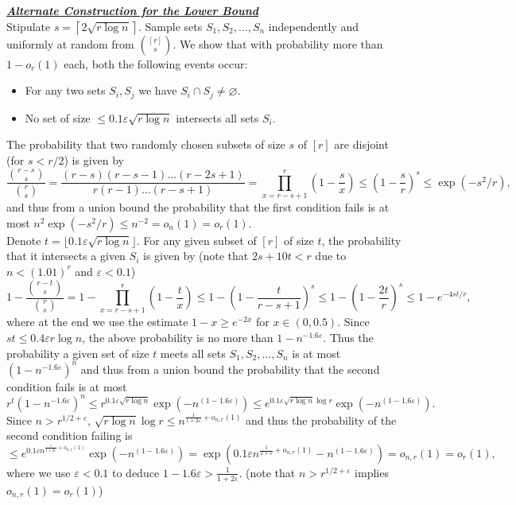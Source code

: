 \documentclass[11pt,a4paper]{article}
\begin{document}
\noindent
\textbf{\underline{\textit{Alternate Construction for the Lower Bound}}} \\
\noindent
Stipulate $s = \left \lceil 2\sqrt{ r \log n} \right\rceil $. Sample sets $S_1, S_2, \dots, S_n$ independently and uniformly at random from $\binom{[r]}{s}$. We show that with probability more than $1-o_r(1)$ each, both the following events occur: 
\begin{itemize}
    \item For any two sets $S_i, S_j$ we have $S_i \cap S_j \ne \varnothing$.
    \item No set of size $\leq 0.1\varepsilon \sqrt{r \log n}$ intersects all sets $S_i$.
\end{itemize}
The probability that two randomly chosen subsets of size $s$ of $[r]$ are disjoint (for $s < r/2$) is given by \[\frac{\binom{r-s}{s}}{\binom{r}{s}} = \frac{(r-s)(r-s-1)\dots(r-2s+1)}{r(r-1)\dots (r-s+1)} = \prod \limits_{x = r-s+1}^{r} \left(1 - \frac{s}{x}\right) \leq \left(1-\frac{s}{r}\right)^s \leq \exp(-s^2/r),\]
and thus from a union bound the probability that the first condition fails is at most $n^2 \exp(-s^2/r) \leq n^{-2} = o_n(1) = o_r(1)$. \\

\noindent
Denote $t = \lfloor 0.1\varepsilon \sqrt{r \log n}\rfloor$. For any given subset of $[r]$ of size $t$, the probability that it intersects a given $S_i$ is given by (note that $2s+10t < r$ due to $n < (1.01)^r$ and $\varepsilon < 0.1$) \[1 - \frac{\binom{r-t}{s}}{\binom{r}{s}} = 1- \prod \limits_{x = r-s+1}^{r} \left(1 - \frac{t}{x}\right) \leq 1 - \left(1 - \frac{t}{r-s+1}\right)^s \leq 1-\left(1 - \frac{2t}{r}\right)^s \leq 1 - e^{-4st/r},\]
where at the end we use the estimate $1-x \geq e^{-2x}$ for $x \in (0,0.5)$. Since $st \leq 0.4\varepsilon r \log n$, the above probability is no more than $1-n^{-1.6\varepsilon}$. Thus the probability a given set of size $t$ meets all sets $S_1, S_2, \dots, S_n$ is at most $\left(1 - n^{-1.6\varepsilon}\right)^n$ and thus from a union bound the probability that the second condition fails is at most \[r^t (1-n^{-1.6 \varepsilon})^n \leq r^{0.1\varepsilon \sqrt{r \log n}} \exp\left(-n^{(1-1.6\varepsilon)}\right) \leq e^{0.1\varepsilon\sqrt{r \log n} \log r } \exp \left(-n^{(1-1.6\varepsilon)}\right).\]
Since $n > r^{1/2+\varepsilon}$, $\sqrt{r \log n} \log r \leq n^{\frac{1}{1+2\varepsilon} +o_{n,r}(1)}$ and thus the probability of the second condition failing is \[\leq e^{0.1\varepsilon n^{\frac{1}{1+2\varepsilon}+o_{n,r}(1)}} \exp\left(-n^{(1-1.6\varepsilon)}\right) = \exp\left(0.1\varepsilon n^{\frac{1}{2+\varepsilon} + o_{n,r}(1) } - n^{(1-1.6\varepsilon)}\right) = o_{n,r}(1) = o_r(1),\]
where we use $\varepsilon < 0.1$ to deduce $1-1.6\varepsilon > \frac{1}{1+2\varepsilon}$. (note that $n > r^{1/2+\varepsilon}$ implies $o_{n,r}(1) = o_{r}(1)$) \\
\end{document}
